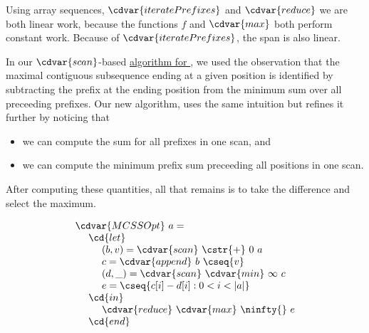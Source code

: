 \begin{cluster}
\label{grp:grm:mcss::cost}

\begin{gram}
\label{grm:mcss::cost}
Using array sequences, $\cdvar{iteratePrefixes}$ and $\cdvar{reduce}$
we are both linear work, because the functions $f$ and $\cdvar{max}$
both perform constant work. 
Because of $\cdvar{iteratePrefixes}$, the span is also linear.

\end{gram}
\end{cluster}

\begin{flex}
\label{grp:alg:mcss::work-optimal-and-low-span}

\begin{algorithm}
\label{alg:mcss::work-optimal-and-low-span}
In our $\cdvar{scan}$-based 
\href{alg:mcss::reduction:mcsse}{algorithm for \MCSSE{}},
we used the observation that 
the maximal contiguous subsequence ending at a given position is
identified by subtracting the prefix at the ending position from the
minimum sum over all preceeding prefixes.
Our new algorithm,  uses the same intuition but refines it
further by noticing that
\begin{itemize}
\item we can compute the sum for all prefixes in one
  scan, and
\item we can compute the minimum prefix sum preceeding all positions in one scan.
\end{itemize}

After computing these quantities, all that remains is to take the
difference and select the maximum.

\[
\begin{array}{l}
\cdvar{MCSSOpt}~a =
\\
~~~~\cd{let}
\\
~~~~~~~~(b,v) = \cdvar{scan}~\cstr{+}~0~a
\\
~~~~~~~~c = \cdvar{append}~b~\cseq{v}
\\
~~~~~~~~(d,\_) = \cdvar{scan}~\cdvar{min}~\infty~c
\\
~~~~~~~~e = \cseq{c[i]-d[i]: 0 < i < |a|}
\\
~~~~\cd{in}
\\
~~~~~~~~\cdvar{reduce}~\cdvar{max}~\ninfty{}~e
\\
~~~~\cd{end}
\end{array}
\]

\end{algorithm}


\end{flex}
